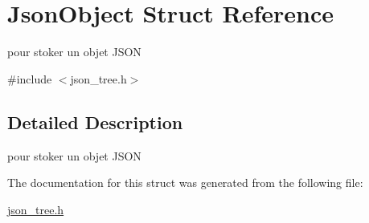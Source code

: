 \hypertarget{structJsonObject}{}\section{Json\+Object Struct Reference}
\label{structJsonObject}


pour stoker un objet J\+S\+ON  




{\ttfamily \#include $<$json\+\_\+tree.\+h$>$}



\subsection{Detailed Description}
pour stoker un objet J\+S\+ON 

The documentation for this struct was generated from the following file\+:\begin{DoxyCompactItemize}
\item 
\hyperlink{json__tree_8h}{json\+\_\+tree.\+h}\end{DoxyCompactItemize}
